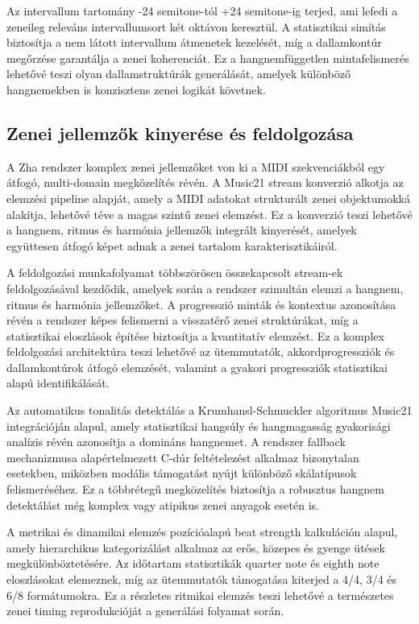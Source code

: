 Az intervallum tartomány -24 semitone-tól +24 semitone-ig terjed, ami lefedi a zeneileg releváns intervallumsort két oktávon keresztül. A statisztikai simítás biztosítja a nem látott intervallum átmenetek kezelését, míg a dallamkontúr megőrzése garantálja a zenei koherenciát. Ez a hangnemfüggetlen mintafelismerés lehetővé teszi olyan dallamstruktúrák generálását, amelyek különböző hangnemekben is konzisztens zenei logikát követnek.

\subsection{Zenei jellemzők kinyerése és feldolgozása}

A Zha rendszer komplex zenei jellemzőket von ki a MIDI szekvenciákból egy átfogó, multi-domain megközelítés révén. A Music21 stream konverzió alkotja az elemzési pipeline alapját, amely a MIDI adatokat strukturált zenei objektumokká alakítja, lehetővé téve a magas szintű zenei elemzést. Ez a konverzió teszi lehetővé a hangnem, ritmus és harmónia jellemzők integrált kinyerését, amelyek együttesen átfogó képet adnak a zenei tartalom karakterisztikáiról.

A feldolgozási munkafolyamat többszörösen összekapcsolt stream-ek feldolgozásával kezdődik, amelyek során a rendszer szimultán elemzi a hangnem, ritmus és harmónia jellemzőket. A progresszió minták és kontextus azonosítása révén a rendszer képes felismerni a visszatérő zenei struktúrákat, míg a statisztikai eloszlások építése biztosítja a kvantitatív elemzést. Ez a komplex feldolgozási architektúra teszi lehetővé az ütemmutatók, akkordprogressziók és dallamkontúrok átfogó elemzését, valamint a gyakori progressziók statisztikai alapú identifikálását.

Az automatikus tonalitás detektálás a Krumhansl-Schmuckler algoritmus Music21 integrációján alapul, amely statisztikai hangsúly és hangmagasság gyakorisági analízis révén azonosítja a domináns hangnemet. A rendszer fallback mechanizmusa alapértelmezett C-dúr feltételezést alkalmaz bizonytalan esetekben, miközben modális támogatást nyújt különböző skálatípusok felismeréséhez. Ez a többrétegű megközelítés biztosítja a robusztus hangnem detektálást még komplex vagy atipikus zenei anyagok esetén is.

A metrikai és dinamikai elemzés pozícióalapú beat strength kalkuláción alapul, amely hierarchikus kategorizálást alkalmaz az erős, közepes és gyenge ütések megkülönböztetésére. Az időtartam statisztikák quarter note és eighth note eloszlásokat elemeznek, míg az ütemmutatók támogatása kiterjed a 4/4, 3/4 és 6/8 formátumokra. Ez a részletes ritmikai elemzés teszi lehetővé a természetes zenei timing reprodukcióját a generálási folyamat során.

